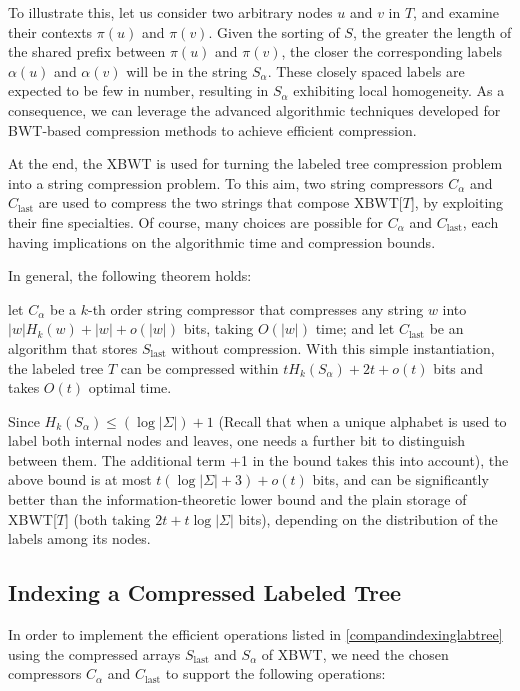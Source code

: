 To illustrate this, let us consider two arbitrary nodes $u$ and $v$ in $T$, and examine their contexts $\pi(u)$ and $\pi(v)$. Given the sorting of $S$, the greater the length of the shared prefix between $\pi(u)$ and $\pi(v)$, the closer the corresponding labels $\alpha(u)$ and $\alpha(v)$ will be in the string $S_{\alpha}$. These closely spaced labels are expected to be few in number, resulting in $S_{\alpha}$ exhibiting local homogeneity. As a consequence, we can leverage the advanced algorithmic techniques developed for BWT-based compression methods to achieve efficient compression.

At the end, the XBWT is used for turning the labeled tree compression problem into a string compression problem. To this aim, two string compressors
$C_{\alpha}$ and $C_{\text{last}}$ are used to compress the two strings that compose XBWT[$T$], by exploiting their fine specialties. Of course, many choices are possible for $C_{\alpha}$ and $C_{\text{last}}$, each having implications on the algorithmic time and compression bounds.

In general, the following theorem holds:

\begin{theorem}
    let $C_{\alpha}$ be a $k$-th order string compressor that compresses any string $w$ into $|w|H_k(w) + |w| + o(|w|)$ bits, taking $O(|w|)$ time; and let $C_{\text{last}}$ be an algorithm that stores $S_{\text{last}}$ without compression. With this simple instantiation, the labeled tree $T$ can be compressed within $t H_k(S_{\alpha}) + 2t + o(t)$ bits and takes $O(t)$ optimal time.
\end{theorem}

Since $H_k(S_\alpha) \leq (\log |\Sigma|) + 1$ (Recall that when a unique alphabet is used to label both internal nodes and leaves, one needs a further bit to distinguish between them. The additional term +1 in the bound takes this into account), the above bound is at most $t(\log |\Sigma| + 3) + o(t)$ bits, and can be significantly better than the information-theoretic lower bound and the plain storage of XBWT[$T$] (both taking $2t + t \log|\Sigma|$ bits), depending on the distribution of the labels among its nodes.

\subsection{Indexing a Compressed Labeled Tree} \label{sec:xbwt_operations}
In order to implement the efficient operations listed in \cref{compandindexinglabtree} using the compressed arrays $S_{\text{last}}$ and $S_{\alpha}$ of XBWT, we need the chosen compressors $C_{\alpha}$ and $C_{\text{last}}$ to support the following operations:

